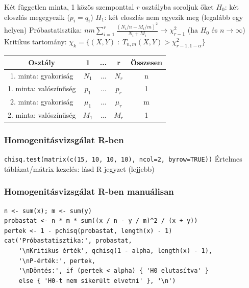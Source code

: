 \documentclass[12pt,a4paper]{article}
\begin{document}
\begin{outline}
	\1 Két független minta, 1 közös szemponttal $r$ osztályba soroljuk őket
	\1 $H_0$: két eloszlás megegyezik ($p_i = q_i$)
	\1 $H_1$: két eloszlás nem egyezik meg (legalább egy helyen)
	\1 Próbastatisztika: $nm \sum_{i=1}^{r} \frac{(N_i/n-M_i/m)^2}{N_i+M_i} \to \chi^2_{r-1}$
	(ha $H_0$ és $n \to \infty$)
	\1 Kritikus tartomány: $\chi_k = \{(X,Y) \;:\; T_{n,m}(X,Y) > \chi^2_{r-1,1-\alpha}\}$
\end{outline}

\begin{table}[h]
	\centering
	\begin{tabular}{|c|c|c|c|c|}
		\hline
		Osztály & 1 & ... & r & Összesen \\
		\hline
		1. minta: gyakoriság & $N_1$ & ... & $N_r$ & n \\
		\hline
		1. minta: valószínűség & $p_1$ & ... & $p_r$ & 1 \\
		\hline
		2. minta: gyakoriság & $\mu_1$ & ... & $\mu_r$ & m \\
		\hline
		2. minta: valószínűség & $M_1$ & ... & $M_r$ & 1 \\
		\hline
	\end{tabular}
\end{table}

\subsubsection{Homogenitásvizsgálat R-ben}

\begin{outline}
	\1 \texttt{chisq.test(matrix(c(15, 10, 10, 10), ncol=2, byrow=TRUE))}
		\2 Értelmes táblázat/mátrix kezelés: lásd R jegyzet (lejjebb)
\end{outline}

\subsubsection{Homogenitásvizsgálat R-ben manuálisan}

\begin{verbatim}
n <- sum(x); m <- sum(y)
probastat <- n * m * sum((x / n - y / m)^2 / (x + y))
pertek <- 1 - pchisq(probastat, length(x) - 1)
cat('Próbastatisztika:', probastat,
    '\nKritikus érték', qchisq(1 - alpha, length(x) - 1),
    '\nP-érték:', pertek,
    '\nDöntés:', if (pertek < alpha) { 'H0 elutasítva' }
    else { 'H0-t nem sikerült elvetni' }, '\n')\end{verbatim}
\end{document}
